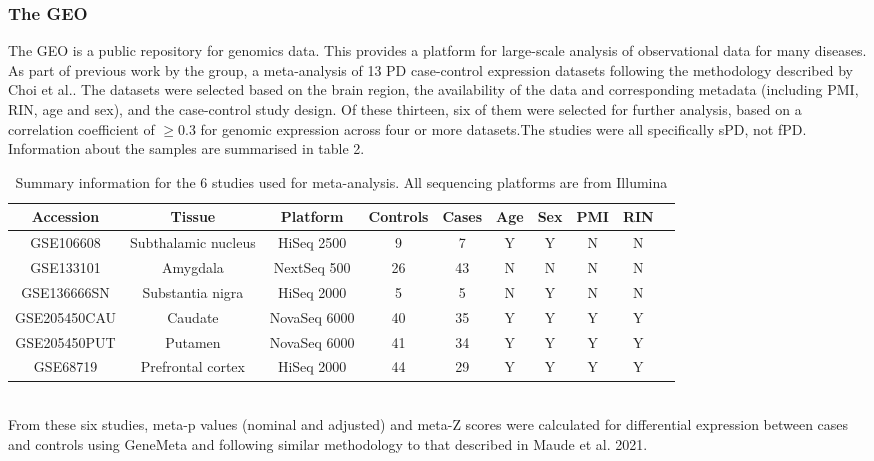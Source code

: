 \documentclass{article}
\begin{document}
\subsubsection{The GEO}
The GEO \cite{Barrett2012NCBISetsupdate} is a public repository for genomics data. This provides a platform for large-scale analysis of observational data for many diseases. As part of previous work by the group, a meta-analysis of 13 PD case-control expression datasets following the methodology described by Choi et al.\cite{Choi2003CombiningVariation}. The datasets were selected based on the brain region, the availability of the data and corresponding metadata (including PMI, RIN, age and sex), and the case-control study design. Of these thirteen, six of them were selected for further analysis, based on a correlation coefficient of $\geq0.3$ for genomic expression across four or more datasets.The studies were all specifically sPD, not fPD. Information about the samples are summarised in table 2.
\begin{table}[h]
    \hskip0cm
    \centering
    \caption{Summary information for the 6 studies used for meta-analysis. All sequencing platforms are from Illumina}
    \begin{tabular}{ |c|c|c|c|c|c|c|c|c|c| }
        \hline
        Accession & Tissue & Platform & Controls & Cases & Age & Sex & PMI & RIN \\ \hline
        GSE106608 & Subthalamic nucleus & HiSeq 2500 & 9 & 7 & Y & Y & N & N \\ \hline
        GSE133101 & Amygdala & NextSeq 500 & 26 & 43 & N & N & N & N \\ \hline
        GSE136666SN & Substantia nigra & HiSeq 2000 & 5 & 5 & N & Y & N & N \\ \hline
        GSE205450CAU & Caudate & NovaSeq 6000 & 40 & 35 & Y & Y & Y & Y \\ \hline
        GSE205450PUT & Putamen & NovaSeq 6000 & 41 & 34 & Y & Y & Y & Y \\ \hline
        GSE68719 & Prefrontal cortex & HiSeq 2000 & 44 & 29 & Y & Y & Y & Y \\ \hline
    \end{tabular}
    \label{tab:my_label}
\end{table}
\\From these six studies, meta-p values (nominal and adjusted) and meta-Z scores were calculated for differential expression between cases and controls using GeneMeta\cite{LusaL2024GeneMeta:Experiments.} and following similar methodology to that described in Maude et al. 2021\cite{Maude2021NewDiabetes.}.
\end{document}
